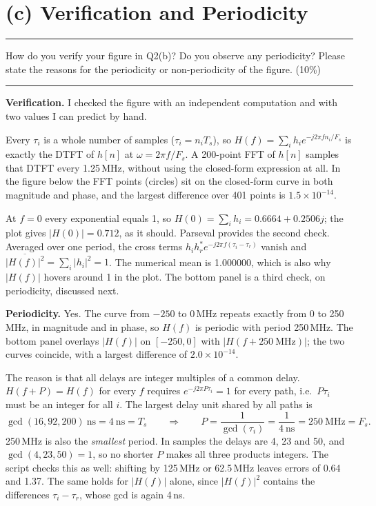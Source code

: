 \documentclass[12pt,a4paper]{report}
\newcommand{\question}[1]{%
    \hrule
    \vspace{0.2cm}
    #1
    \vspace{0.2cm}
    \hrule
    \vspace{0.5cm}
}
\begin{document}
\newpage

\section{(c) Verification and Periodicity}

\question{How do you verify your figure in Q2(b)? Do you observe any periodicity? Please state the reasons for the
periodicity or non-periodicity of the figure. (10\%)}

\textbf{Verification.} I checked the figure with an independent computation and with two values I can predict by hand.

Every $\tau_i$ is a whole number of samples ($\tau_i = n_i T_s$), so $H(f) = \sum_i h_i e^{-j2\pi f n_i/F_s}$ is exactly
the DTFT of $h[n]$ at $\omega = 2\pi f/F_s$. A 200-point FFT of $h[n]$ samples that DTFT every 1.25\,MHz, without using
the closed-form expression at all. In the figure below the FFT points (circles) sit on the closed-form curve in both
magnitude and phase, and the largest difference over 401 points is $1.5 \times 10^{-14}$.

At $f = 0$ every exponential equals 1, so $H(0) = \sum_i h_i = 0.6664 + 0.2506j$; the plot gives $|H(0)| = 0.712$, as it
should. Parseval provides the second check. Averaged over one period, the cross terms
$h_i h_r^* e^{-j2\pi f(\tau_i - \tau_r)}$ vanish and $\overline{|H(f)|^2} = \sum_i |h_i|^2 = 1$. The numerical mean is
1.000000, which is also why $|H(f)|$ hovers around 1 in the plot. The bottom panel is a third check, on periodicity,
discussed next.

\textbf{Periodicity.} Yes. The curve from $-250$ to 0\,MHz repeats exactly from 0 to 250\,MHz, in magnitude and in
phase, so $H(f)$ is periodic with period 250\,MHz. The bottom panel overlays $|H(f)|$ on $[-250, 0]$ with
$|H(f + 250\ \text{MHz})|$; the two curves coincide, with a largest difference of $2.0 \times 10^{-14}$.

The reason is that all delays are integer multiples of a common delay. $H(f + P) = H(f)$ for every $f$ requires
$e^{-j2\pi P\tau_i} = 1$ for every path, i.e.\ $P\tau_i$ must be an integer for all $i$. The largest delay unit shared
by all paths is
\begin{equation}
    \gcd(16, 92, 200)\ \text{ns} = 4\ \text{ns} = T_s
    \qquad\Rightarrow\qquad
    P = \frac{1}{\gcd(\tau_i)} = \frac{1}{4\ \text{ns}} = 250\ \text{MHz} = F_s .
\end{equation}
250\,MHz is also the \emph{smallest} period. In samples the delays are 4, 23 and 50, and $\gcd(4, 23, 50) = 1$, so no
shorter $P$ makes all three products integers. The script checks this as well: shifting by 125\,MHz or 62.5\,MHz
leaves errors of 0.64 and 1.37. The same holds for $|H(f)|$ alone, since $|H(f)|^2$ contains the differences
$\tau_i - \tau_r$, whose gcd is again 4\,ns.
\end{document}
